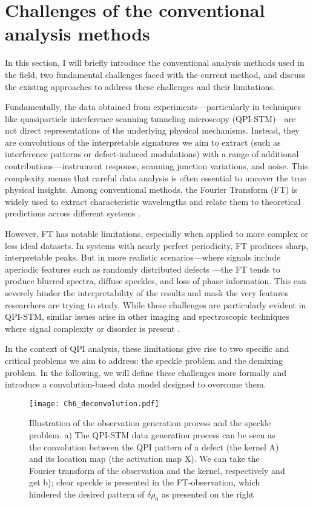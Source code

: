 \section{Challenges of the conventional analysis methods}
In this section, I will briefly introduce the conventional analysis methods used in the field, two fundamental challenges faced with the current method, and discuss the existing approaches to address these challenges and their limitations. 

Fundamentally, the data obtained from experiments—particularly in techniques like quasiparticle interference scanning tunneling microscopy (QPI-STM)—are not direct representations of the underlying physical mechanisms. Instead, they are convolutions of the interpretable signatures we aim to extract (such as interference patterns or defect-induced modulations) with a range of additional contributions—instrument response, scanning junction variations, and noise. This complexity means that careful data analysis is often essential to uncover the true physical insights. Among conventional methods, the Fourier Transform (FT) is widely used to extract characteristic wavelengths and relate them to theoretical predictions across different systems \cite{ardiniHighthroughputMultimodalWidefield2023}\cite{jaffeDifferenceFourierAnalysis1987}
\noindent \cite{sciuttoFTNIRMicroscopyAdvanced2014}\cite{kimotoAssessmentLowervoltageTEM2012}.

However, FT has notable limitations, especially when applied to more complex or less ideal datasets. In systems with nearly perfect periodicity, FT produces sharp, interpretable peaks. But in more realistic scenarios—where signals include aperiodic features such as randomly distributed defects —the FT tends to produce blurred spectra, diffuse speckles, and loss of phase information. This can severely hinder the interpretability of the results and mask the very features researchers are trying to study. While these challenges are particularly evident in QPI-STM, similar issues arise in other imaging and spectroscopic techniques where signal complexity or disorder is present\cite{bonnetHumanAcuteMyeloid1997} \cite{draijerReviewLaserSpeckle2009}.

In the context of QPI analysis, these limitations give rise to two specific and critical problems we aim to address: the speckle problem and the demixing problem. In the following, we will define these challenges more formally and introduce a convolution-based data model designed to overcome them.
\begin{figure}
	\texttt{[image: Ch6\_deconvolution.pdf]} 
	\centering
	\caption{Illustration of the observation generation process and the speckle problem. a) The QPI-STM data generation process can be seen as the convolution between the QPI pattern of a defect (the kernel A) and its location map (the activation map X). We can take the Fourier transform of the observation and the kernel, respectively and get b); clear speckle is presented in the FT-observation, which hindered the desired pattern of $\delta\rho_0$ as presented on the right}
	\label{fig:ch6_decon}
\end{figure}

